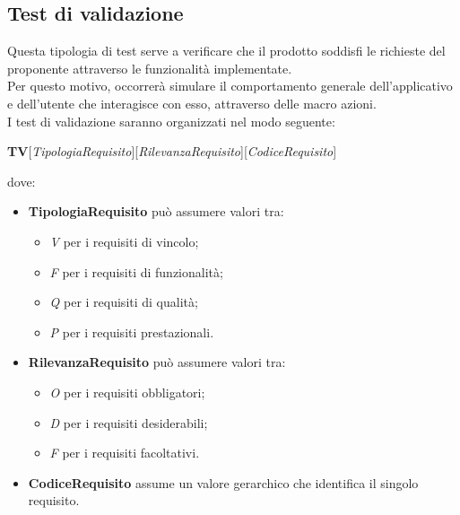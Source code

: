 	\clearpage
	
	\subsection{Test di validazione}
	Questa tipologia di test serve a verificare che il prodotto soddisfi le richieste del proponente attraverso le funzionalità implementate.\\
	Per questo motivo, occorrerà simulare il comportamento generale dell'applicativo e dell'utente che interagisce con esso, attraverso delle macro azioni.\\
	I test di validazione saranno organizzati nel modo seguente:
	\begin{center}
		\textbf{TV}[\textit{TipologiaRequisito}][\textit{RilevanzaRequisito}][\textit{CodiceRequisito}]
	\end{center}
	dove:
	\begin{itemize}
		\item
		\textbf{TipologiaRequisito} può assumere valori tra:
		\begin{itemize}
			\item
			\textit{V} per i requisiti di vincolo;
			\item
			\textit{F} per i requisiti di funzionalità;
			\item
			\textit{Q} per i requisiti di qualità;
			\item
			\textit{P} per i requisiti prestazionali.
		\end{itemize}
		\item 
		\textbf{RilevanzaRequisito} può assumere valori tra:
		\begin{itemize}
			\item
			\textit{O} per i requisiti obbligatori;
			\item
			\textit{D} per i requisiti desiderabili;
			\item
			\textit{F} per i requisiti facoltativi.
		\end{itemize}
		\item
		\textbf{CodiceRequisito} assume un valore gerarchico che identifica il singolo requisito.
	\end{itemize}

